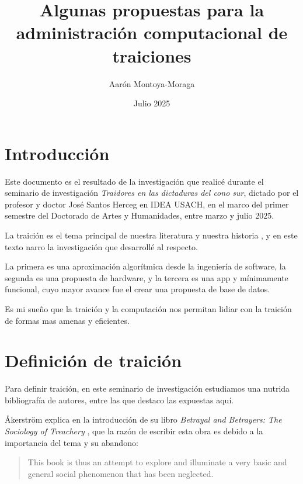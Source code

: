 \documentclass{article}
\title{Algunas propuestas para la administración computacional de traiciones}
\author{Aarón Montoya-Moraga}
\date{Julio 2025}
\begin{document}
\maketitle

\renewcommand*\contentsname{Tabla de contenidos}

\tableofcontents

\clearpage

\section{Introducción}

Este documento es el resultado de la investigación que realicé durante el seminario de investigación \textit{Traidores en las dictaduras del cono sur}, dictado por el profesor y doctor José Santos Herceg en IDEA USACH, en el marco del primer semestre del Doctorado de Artes y Humanidades, entre marzo y julio 2025.

La traición es el tema principal de nuestra literatura y nuestra historia \cite[p. 138]{ordinaryVicesShklar}, y en este texto narro la investigación que desarrollé al respecto.

La primera es una aproximación algorítmica desde la ingeniería de software, la segunda es una propuesta de hardware, y la tercera es una app y mínimamente funcional, cuyo mayor avance fue el crear una propuesta de base de datos.

Es mi sueño que la traición y la computación nos permitan lidiar con la traición de formas mas amenas y eficientes.

\clearpage

\section{Definición de traición}

Para definir traición, en este seminario de investigación estudiamos una nutrida bibliografía de autores, entre las que destaco las expuestas aquí.

Åkerström explica en la introducción de su libro \textit{Betrayal and Betrayers: The Sociology of Treachery} , que la razón de escribir esta obra es debido a la importancia del tema y su abandono:

\begin{quote}
This book is thus an attempt to explore and illuminate a very basic and general social phenomenon that has been neglected.\cite[p. x]{betrayalBetrayersAkerstrom}

\end{quote}
\end{document}

